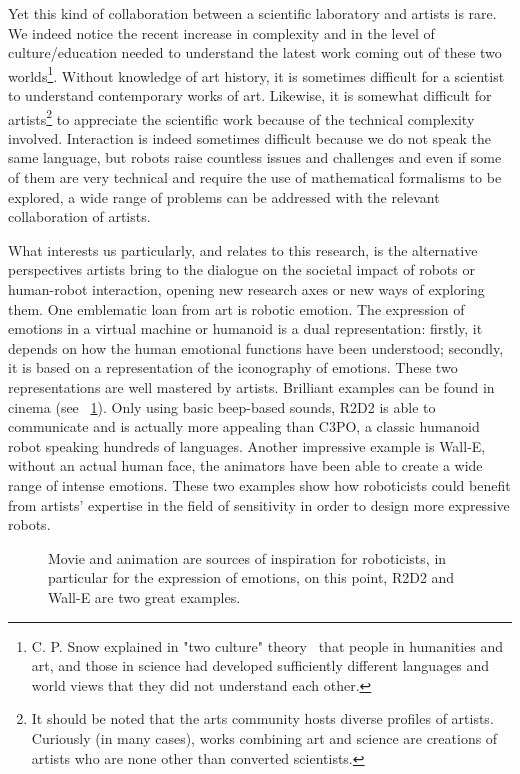 Yet this kind of collaboration between a scientific laboratory and artists is rare.
We indeed notice the recent increase in complexity and in the level of culture/education needed to understand the latest work coming out of these two worlds\footnote{C. P. Snow explained in "two culture" theory~\parencite{snow2012two} that people in humanities and art, and those in science had developed sufficiently different languages and world views that they did not understand each other.}. Without knowledge of art history, it is sometimes difficult for a scientist to understand contemporary works of art. Likewise, it is somewhat difficult for artists\footnote{It should be noted that the arts community hosts diverse profiles of artists. Curiously (in many cases), works combining art and science are creations of artists who are none other than converted scientists.} to appreciate the scientific work because of the technical complexity involved.
Interaction is indeed sometimes difficult because we do not speak the same language, but robots raise countless issues and challenges and even if some of them are very technical and require the use of mathematical formalisms to be explored, a wide range of problems can be addressed with the relevant collaboration of artists.

What interests us particularly, and relates to this research, is the alternative perspectives artists bring to the dialogue on  the societal impact of robots or human-robot interaction, opening new research axes or new ways of exploring them.
One emblematic  loan  from art is robotic emotion. The expression of emotions in a virtual machine or humanoid is a dual representation: firstly, it depends on how the human emotional functions have been understood; secondly, it is based on a representation of the iconography of emotions. These two representations are well mastered by artists. Brilliant examples can be found in cinema (see \figurename~\ref{fig:robot_emotion_cinema}). Only using basic beep-based sounds, R2D2 is able to communicate and is actually more appealing than C3PO, a classic humanoid robot speaking hundreds of languages. Another impressive example is Wall-E, without an actual human face, the animators have been able to create a wide range of intense emotions.
These two examples show how roboticists could benefit from artists’ expertise in the field of sensitivity in order to design more expressive robots.


\begin{figure}[tb]
\centering
    \hfil
    \caption{Movie and animation are sources of inspiration for roboticists, in particular for the expression of emotions, on this point, R2D2 and Wall-E are two great examples.}
    \label{fig:robot_emotion_cinema}
\end{figure}


